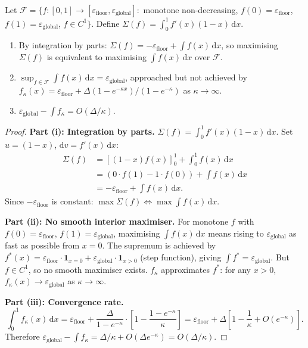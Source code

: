 \begin{theorem}
\label{thm:tf-v4-variational}
Let $\mathcal{F} = \{f : [0, 1] \to [\varepsilon_{\mathrm{floor}},
\varepsilon_{\mathrm{global}}]:$ monotone non-decreasing,
$f(0) = \varepsilon_{\mathrm{floor}}$,
$f(1) = \varepsilon_{\mathrm{global}}$, $f \in C^1\}$. Define
$\Sigma(f) = \int_0^1 f'(x)(1 - x)\,\mathrm{d}x$.
\begin{enumerate}
\item[(i)] By integration by parts:
$\Sigma(f) = -\varepsilon_{\mathrm{floor}} +
\int f(x)\,\mathrm{d}x$, so maximising $\Sigma(f)$ is equivalent to
maximising $\int f(x)\,\mathrm{d}x$ over $\mathcal{F}$.
\item[(ii)] $\sup_{f \in \mathcal{F}} \int f(x)\,\mathrm{d}x =
\varepsilon_{\mathrm{global}}$, approached but not achieved by
$f_\kappa(x) = \varepsilon_{\mathrm{floor}} + \Delta(1 - e^{-\kappa
x}) / (1 - e^{-\kappa})$ as $\kappa \to \infty$.
\item[(iii)] $\varepsilon_{\mathrm{global}} - \int f_\kappa =
O(\Delta / \kappa)$.
\end{enumerate}
\end{theorem}

\begin{proof}
\medskip\noindent\textbf{Part (i): Integration by parts.}
$\Sigma(f) = \int_0^1 f'(x)(1 - x)\,\mathrm{d}x$. Set $u = (1 - x)$,
$\mathrm{d}v = f'(x)\,\mathrm{d}x$:
\begin{align}
\Sigma(f) &= [(1 - x) f(x)]_0^1 + \int_0^1 f(x)\,\mathrm{d}x \\
&= (0 \cdot f(1) - 1 \cdot f(0)) + \int f(x)\,\mathrm{d}x \\
&= -\varepsilon_{\mathrm{floor}} + \int f(x)\,\mathrm{d}x.
\end{align}
Since $-\varepsilon_{\mathrm{floor}}$ is constant: $\max \Sigma(f)
\Leftrightarrow \max \int f(x)\,\mathrm{d}x$.

\medskip\noindent\textbf{Part (ii): No smooth interior maximiser.}
For monotone $f$ with $f(0) = \varepsilon_{\mathrm{floor}}$,
$f(1) = \varepsilon_{\mathrm{global}}$, maximising
$\int f(x)\,\mathrm{d}x$ means rising to
$\varepsilon_{\mathrm{global}}$ as fast as possible from $x = 0$.
The supremum is achieved by $f^*(x) = \varepsilon_{\mathrm{floor}}
\cdot \mathbf{1}_{x = 0} + \varepsilon_{\mathrm{global}} \cdot
\mathbf{1}_{x > 0}$ (step function), giving $\int f^* =
\varepsilon_{\mathrm{global}}$. But $f \in C^1$, so no smooth
maximiser exists. $f_\kappa$ approximates $f^*$: for any $x > 0$,
$f_\kappa(x) \to \varepsilon_{\mathrm{global}}$ as $\kappa \to
\infty$.

\medskip\noindent\textbf{Part (iii): Convergence rate.}
\begin{equation}
\int_0^1 f_\kappa(x)\,\mathrm{d}x =
\varepsilon_{\mathrm{floor}} + \frac{\Delta}{1 - e^{-\kappa}}
\cdot \!\left[1 - \frac{1 - e^{-\kappa}}{\kappa}\right]
= \varepsilon_{\mathrm{floor}} + \Delta\!\left[1 - \frac{1}{\kappa}
+ O(e^{-\kappa})\right].
\end{equation}
Therefore $\varepsilon_{\mathrm{global}} - \int f_\kappa = \Delta /
\kappa + O(\Delta e^{-\kappa}) = O(\Delta / \kappa)$.
\end{proof}

